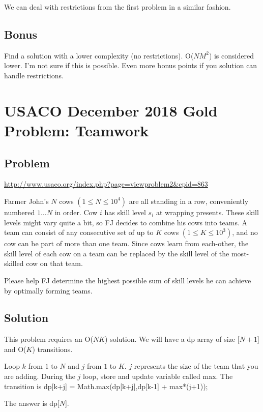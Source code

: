 \documentclass{article}
\begin{document}
We can deal with restrictions from the first problem in a similar fashion.

\subsection{Bonus}
Find a solution with a lower complexity (no restrictions). O($NM^{2}$) is considered lower. I'm not sure if this is possible. Even more bonus points if you solution can handle restrictions.

\section{USACO December 2018 Gold Problem: Teamwork}
\subsection{Problem}
\url{http://www.usaco.org/index.php?page=viewproblem2&cpid=863}

Farmer John's $N$ cows $(1 \leq N \leq 10^{4})$ are all standing in a row, conveniently numbered $1 \ldots N$ in order. Cow $i$ has skill level $s_i$ at wrapping presents. These skill levels might vary quite a bit, so FJ decides to combine his cows into teams. A team can consist of any consecutive set of up to $K$ cows $(1 \leq K \leq 10^{3})$, and no cow can be part of more than one team. Since cows learn from each-other, the skill level of each cow on a team can be replaced by the skill level of the most-skilled cow on that team.

Please help FJ determine the highest possible sum of skill levels he can achieve by optimally forming teams.

\subsection{Solution}
This problem requires an O($NK$) solution. We will have a dp array of size [$N+1$] and O($K$) transitions.

Loop $k$ from $1$ to $N$ and $j$ from $1$ to $K.$ $j$ represents the size of the team that you are adding. During the $j$ loop, store and update variable called max. The transition is dp[k+j] = Math.max(dp[k+j],dp[k-1] + max*(j+1)); 

The answer is dp[$N$].
\end{document}
